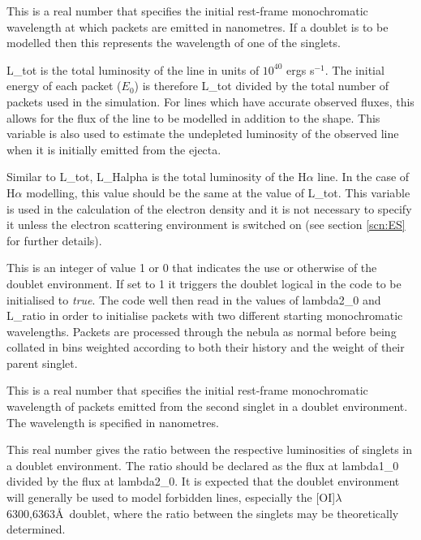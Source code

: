 
 This is a real number that specifies the initial rest-frame monochromatic wavelength at which packets are emitted in nanometres.  If a doublet is to be modelled then this represents the wavelength of one of the singlets.


 L\_tot is the total luminosity of the line in units of $10^{40}$ ergs s$^{-1}$.  The initial energy of each packet ($E_0$) is therefore L\_tot divided by the total number of packets used in the simulation. For lines which have accurate observed fluxes, this allows for the flux of the line to be modelled in addition to the shape.  This variable is also used to estimate the undepleted luminosity of the observed line when it is initially emitted from the ejecta.


 Similar to L\_tot, L\_Halpha is the total luminosity of the H${\alpha}$ line.  In the case of H${\alpha}$ modelling, this value should be the same at the value of L\_tot.  This variable is used in the calculation of the electron density and it is not necessary to specify it unless the electron scattering environment is switched on (see section \ref{scn:ES} for further details).  


 This is an integer of value 1 or 0 that indicates the use or otherwise of the doublet environment.  If set to 1 it triggers the doublet logical in the code to be initialised to \textit{true}.  The code well then read in the values of {lambda2\_0} and {L\_ratio} in order to initialise packets with two different starting monochromatic wavelengths.  Packets are processed through the nebula as normal before being collated in bins weighted according to both their history and the weight of their parent singlet.


 This is a real number that specifies the initial rest-frame monochromatic wavelength of packets emitted from the second singlet in a doublet environment.  The wavelength is specified in nanometres.


 This real number gives the ratio between the respective luminosities of singlets in a doublet environment.  The ratio should be declared as the flux at lambda1\_0 divided by the flux at lambda2\_0.  It is expected that the doublet environment will generally be used to model forbidden lines, especially the [OI]$\lambda$6300,6363\AA\ doublet, where the ratio between the singlets may be theoretically determined.

